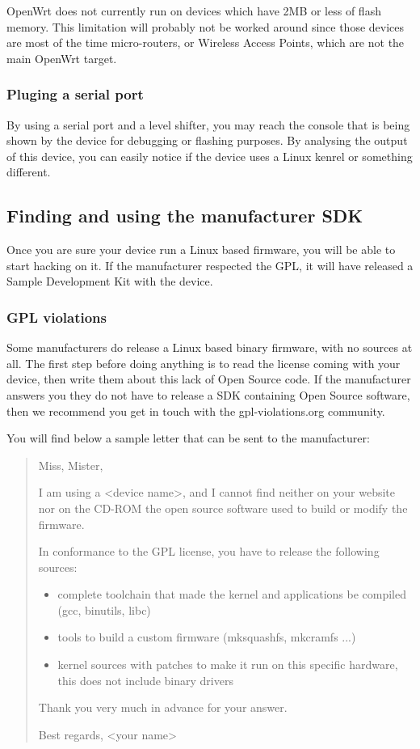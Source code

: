 OpenWrt does not currently run on devices which have 2MB or less of flash memory.
This limitation will probably not be worked around since those devices are most 
of the time micro-routers, or Wireless Access Points, which are not the main 
OpenWrt target.

\subsubsection{Pluging a serial port}

By using a serial port and a level shifter, you may reach the console that is being shown by the device
for debugging or flashing purposes. By analysing the output of this device, you can
easily notice if the device uses a Linux kenrel or something different.

\subsection{Finding and using the manufacturer SDK}

Once you are sure your device run a Linux based firmware, you will be able to start
hacking on it. If the manufacturer respected the GPL, it will have released a Sample
Development Kit with the device.

\subsubsection{GPL violations}

Some manufacturers do release a Linux based binary firmware, with no sources at all.
The first step before doing anything is to read the license coming with your device,
then write them about this lack of Open Source code. If the manufacturer answers
you they do not have to release a SDK containing Open Source software, then we 
recommend you get in touch with the gpl-violations.org community.

You will find below a sample letter that can be sent to the manufacturer:

\begin{verse}
Miss, Mister,

I am using a <device name>, and I cannot find neither on your website nor on the 
CD-ROM the open source software used to build or modify the firmware.

In conformance to the GPL license, you have to release the following sources:

\begin{itemize}
\item complete toolchain that made the kernel and applications be compiled (gcc, binutils, libc)
\item tools to build a custom firmware (mksquashfs, mkcramfs ...)
\item kernel sources with patches to make it run on this specific hardware, this does not include binary drivers
\end{itemize}

Thank you very much in advance for your answer.

Best regards, <your name>
\end{verse}


